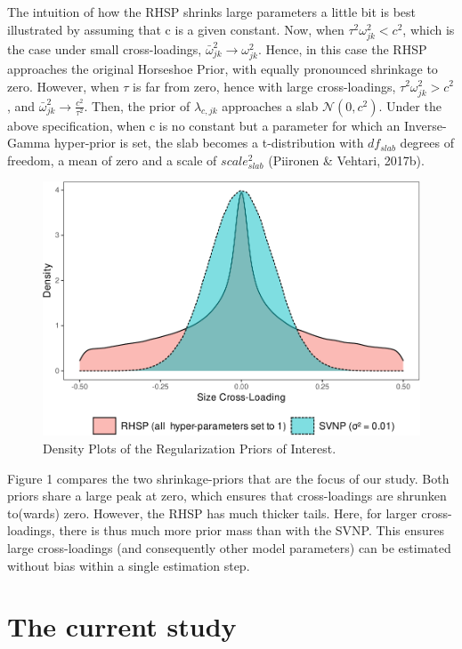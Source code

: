 \documentclass[
  man, donotrepeattitle,floatsintext]{apa6}
\begin{document}
The intuition of how the RHSP shrinks large parameters a little bit is best illustrated by assuming that c is a given constant. Now, when \(\tau^2 \omega^2_{jk} < c^2\), which is the case under small cross-loadings, \(\bar{\omega}^2_{jk} \to \omega^2_{jk}\). Hence, in this case the RHSP approaches the original Horseshoe Prior, with equally pronounced shrinkage to zero. However, when \(\tau\) is far from zero, hence with large cross-loadings, \(\tau^2 \omega^2_{jk} > c^2\), and \(\bar{\omega}^2_{jk} \to \frac{c^2}{\tau^2}\). Then, the prior of \(\lambda_{c,jk}\) approaches a slab \(\mathcal{N}(0, c^2)\). Under the above specification, when c is no constant but a parameter for which an Inverse-Gamma hyper-prior is set, the slab becomes a t-distribution with \(df_{slab}\) degrees of freedom, a mean of zero and a scale of \(scale_{slab}^2\) (Piironen \& Vehtari, 2017b).

\begin{figure}
\centering
\includegraphics{JMBKoch_thesis_files/figure-latex/unnamed-chunk-1-1.pdf}
\caption{\label{fig:unnamed-chunk-1}Density Plots of the Regularization Priors of Interest.}
\end{figure}

Figure 1 compares the two shrinkage-priors that are the focus of our study. Both priors share a large peak at zero, which ensures that cross-loadings are shrunken to(wards) zero. However, the RHSP has much thicker tails. Here, for larger cross-loadings, there is thus much more prior mass than with the SVNP. This ensures large cross-loadings (and consequently other model parameters) can be estimated without bias within a single estimation step.

\hypertarget{the-current-study}{%
\section{The current study}\label{the-current-study}}
\end{document}
